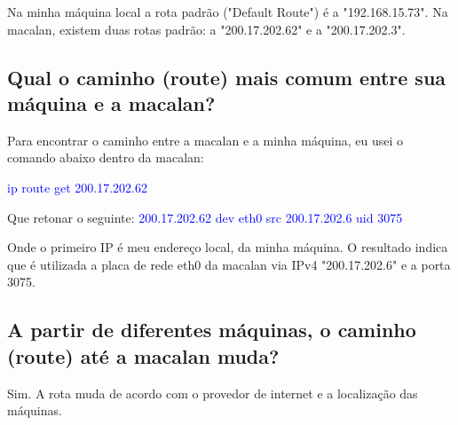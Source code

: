\documentclass{article}
\begin{document}
Na minha máquina local a rota padrão ("Default Route") é a "192.168.15.73". Na macalan, existem duas rotas padrão: a "200.17.202.62" e a "200.17.202.3".


\subsection{Qual o caminho (route) mais comum entre sua máquina e a macalan?}

Para encontrar o caminho entre a macalan e a minha máquina, eu usei o comando abaixo dentro da macalan:

\textcolor{blue}{ip route get 200.17.202.62} 

Que retonar o seguinte: 
\textcolor{blue}{200.17.202.62 dev eth0 src 200.17.202.6 uid 3075} 

Onde o primeiro IP é meu endereço local, da minha máquina.
O resultado indica que é utilizada a placa de rede eth0 da macalan via IPv4 "200.17.202.6" e a porta 3075.


\subsection{A partir de diferentes máquinas, o caminho (route) até a macalan muda?}

Sim. A rota muda de acordo com o provedor de internet e a localização das máquinas.
\end{document}
